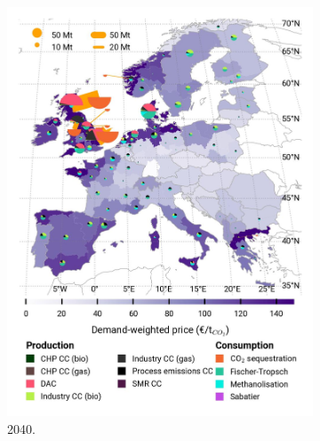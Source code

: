 \documentclass[preprint,12pt,sort&compress]{elsarticle}
\begin{document}
\begin{figure}[htbp]
\begin{subfigure}[t]{0.33\textwidth}
      \includegraphics[width=1\textwidth]{maps/no-pipelines-no-pcipmi/base_s_adm___2040-balance_map_co2_stored} 
      \caption{ 2040.}
      \label{fig:DI_lt_2040_co2}
  \end{subfigure}
  \begin{subfigure}[t]{0.33\textwidth}
      \vspace{0pt}

\end{subfigure}
\end{figure}
\end{document}
